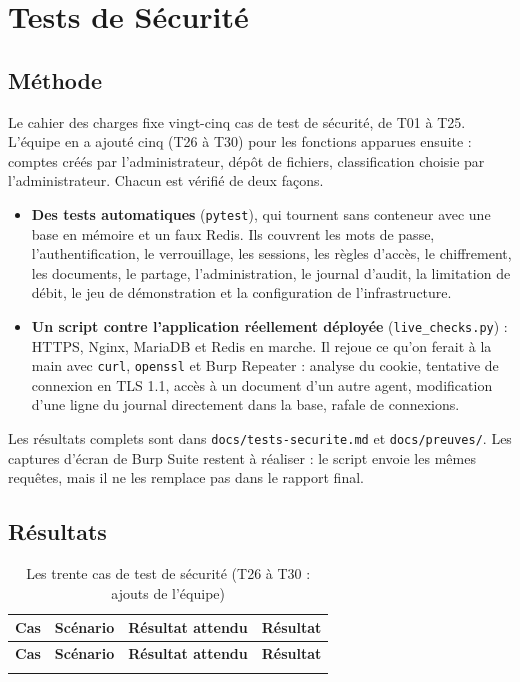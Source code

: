 \documentclass[12pt,a4paper]{report}
\newcommand{\code}[1]{\texttt{\NoAutoSpacing #1}}
\begin{document}
\chapter{Tests de Sécurité}

\section{Méthode}

Le cahier des charges fixe vingt-cinq cas de test de sécurité, de T01 à T25. L'équipe en a ajouté cinq (T26 à T30) pour les fonctions apparues ensuite : comptes créés par l'administrateur, dépôt de fichiers, classification choisie par l'administrateur. Chacun est vérifié de deux façons.

\begin{itemize}
  \item \textbf{Des tests automatiques} (\code{pytest}), qui tournent sans conteneur avec une base en mémoire et un faux Redis. Ils couvrent les mots de passe, l'authentification, le verrouillage, les sessions, les règles d'accès, le chiffrement, les documents, le partage, l'administration, le journal d'audit, la limitation de débit, le jeu de démonstration et la configuration de l'infrastructure.
  \item \textbf{Un script contre l'application réellement déployée} (\code{live\_checks.py}) : HTTPS, Nginx, MariaDB et Redis en marche. Il rejoue ce qu'on ferait à la main avec \code{curl}, \code{openssl} et Burp Repeater : analyse du cookie, tentative de connexion en TLS 1.1, accès à un document d'un autre agent, modification d'une ligne du journal directement dans la base, rafale de connexions.
\end{itemize}

Les résultats complets sont dans \code{docs/tests-securite.md} et \code{docs/preuves/}. Les captures d'écran de Burp Suite restent à réaliser : le script envoie les mêmes requêtes, mais il ne les remplace pas dans le rapport final.

\section{Résultats}

\begin{longtable}{@{}l >{\raggedright\arraybackslash}p{5.6cm} >{\raggedright\arraybackslash}p{5.3cm} l@{}}
\caption{Les trente cas de test de sécurité (T26 à T30 : ajouts de l'équipe)}\\
\toprule
\textbf{Cas} & \textbf{Scénario} & \textbf{Résultat attendu} & \textbf{Résultat} \\
\midrule
\endfirsthead
\toprule
\textbf{Cas} & \textbf{Scénario} & \textbf{Résultat attendu} & \textbf{Résultat} \\
\midrule
\endhead
\bottomrule
\endfoot

\end{longtable}
\end{document}
